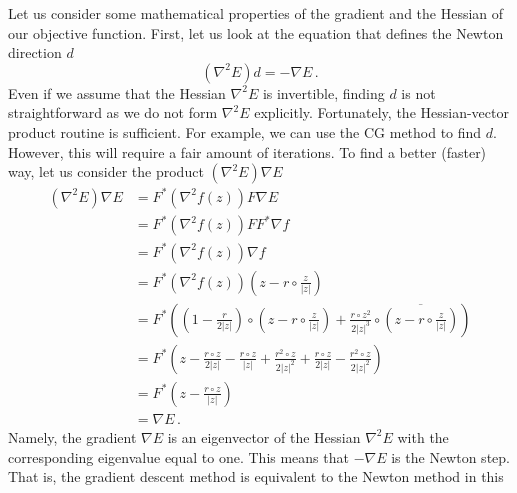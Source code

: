 Let us consider some mathematical properties of the gradient and the
Hessian of our objective function. First, let us look at the equation
that defines the Newton direction $d$
\begin{equation}
  \label{eq:69}
  \left(
    \nabla^{2}E
  \right) d
  = -\nabla E \,. 
\end{equation}
Even if we assume that the Hessian $\nabla^{2}E$ is
invertible, finding $d$ is not straightforward as we do not form
$\nabla^{2}E$ explicitly. Fortunately, the Hessian-vector product
routine is sufficient. For example, we can use the CG method to find
$d$. However, this will require a fair amount of iterations. To find a
better (faster) way, let us consider the product $(\nabla^{2}E) \nabla
E$
\begin{equation}
  \label{eq:82}
  \begin{split}
    (\nabla^{2}E)\nabla E
    & = F^{*}\left(\nabla^{2}f(z)\right)F\nabla E\\
    & = F^{*}\left(\nabla^{2}f(z)\right)FF^{*}\nabla f\\
    & = F^{*}\left(\nabla^{2}f(z)\right)\nabla f\\
    & = F^{*}\left(\nabla^{2}f(z)\right) \left( z - r\circ
      \frac{z}{|z|}\right)\\
    & = F^{*}
    \left(
      \left(
        1 - \frac{r}{2|z|}
      \right)
      \circ
      \left(
          z - r\circ
          \frac{z}{|z|}
        \right)
      + 
      \frac{r\circ z^{2}}{2|z|^{3}} 
      \circ
      \overline{
        \left(
          z - r\circ
          \frac{z}{|z|}
        \right)
      }
    \right) \\
    & = F^{*}
    \left(
      z - \frac{r\circ z}{2|z|} - \frac{r\circ z}{|z|} +
      \frac{r^{2}\circ z}{2|z|^{2}} + \frac{r\circ z}{2|z|} -
      \frac{r^{2}\circ z}{2|z|^{2}}
    \right) \\
    & = F^{*}
    \left(
      z - \frac{r\circ z}{|z|}
    \right) \\
    & = \nabla E \,. 
  \end{split}
\end{equation}
Namely, the gradient $\nabla E$ is an eigenvector of the Hessian
$\nabla^{2}E$ with the corresponding eigenvalue equal to one. This
means that $-\nabla E$ is the Newton step. That is, the
gradient descent method is equivalent to the Newton method in this
